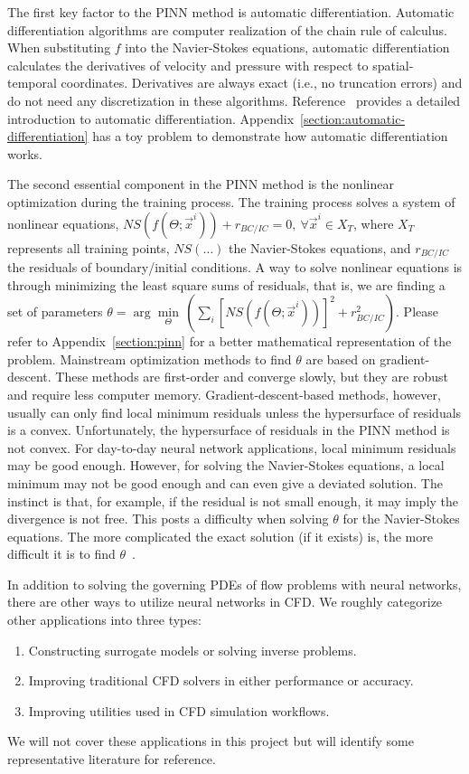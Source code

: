 The first key factor to the PINN method is automatic differentiation.
Automatic differentiation algorithms are computer realization of the chain rule of calculus.
When substituting $f$ into the Navier-Stokes equations, automatic differentiation calculates the derivatives of velocity and pressure with respect to spatial-temporal coordinates.
Derivatives are always exact (i.e., no truncation errors) and do not need any discretization in these algorithms.
Reference~\cite{griewank_automatic_1988} provides a detailed introduction to automatic differentiation.
Appendix~\ref{section:automatic-differentiation} has a toy problem to demonstrate how automatic differentiation works.

The second essential component in the PINN method is the nonlinear optimization during the training process.
The training process solves a system of nonlinear equations, $NS{\left(f\left(\Theta; \vec{x}^i\right)\right)}+r_{BC/IC}=0,~\forall \vec{x}^i\in X_T$, where $X_T$ represents all training points, $NS{\left(\dots\right)}$ the Navier-Stokes equations, and $r_{BC/IC}$ the residuals of boundary/initial conditions.
A way to solve nonlinear equations is through minimizing the least square sums of residuals, that is, we are finding a set of parameters $\theta=\arg\min\limits_{\Theta}\,\left(\sum\limits_{i}{\left[NS\left(f\left(\Theta;\vec{x}^i\right)\right)\right]}^2+r_{BC/IC}^2\right)$.
Please refer to Appendix~\ref{section:pinn} for a better mathematical representation of the problem.
Mainstream optimization methods to find $\theta$ are based on gradient-descent.
These methods are first-order and converge slowly, but they are robust and require less computer memory.
Gradient-descent-based methods, however, usually can only find local minimum residuals unless the hypersurface of residuals is a convex.
Unfortunately, the hypersurface of residuals in the PINN method is not convex.
For day-to-day neural network applications, local minimum residuals may be good enough.
However, for solving the Navier-Stokes equations, a local minimum may not be good enough and can even give a deviated solution.
The instinct is that, for example, if the residual is not small enough, it may imply the divergence is not free.
This posts a difficulty when solving $\theta$ for the Navier-Stokes equations. 
The more complicated the exact solution (if it exists) is, the more difficult it is to find $\theta$~\cite{zhu_physics-constrained_2019}.

In addition to solving the governing PDEs of flow problems with neural networks, there are other ways to utilize neural networks in CFD\@.
We roughly categorize other applications into three types:
\begin{enumerate}
    \item Constructing surrogate models or solving inverse problems.
    \item Improving traditional CFD solvers in either performance or accuracy.
    \item Improving utilities used in CFD simulation workflows.
\end{enumerate}
We will not cover these applications in this project but will identify some representative literature for reference.


